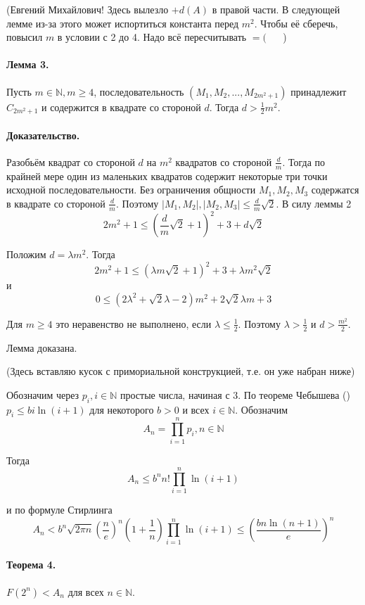 \documentclass[a4paper,14pt]{article} %
\begin{document}
(Евгений Михайлович! Здесь вылезло $+d(A)$ в правой части.
В следующей лемме из-за этого может испортиться константа перед $m^2$.
Чтобы её сберечь, повысил $m$ в условии с 2 до 4.
Надо всё пересчитывать $=($ ~~ )

\paragraph{Лемма 3.}
Пусть $m\in\mathbb{N}, m\geq 4$, последовательность $(M_1,M_2,...,M_{2m^2+1})$ принадлежит $C_{2m^2+1}$ и содержится в квадрате со стороной $d$.
Тогда $d>\frac{1}{2}m^2$.

\paragraph{Доказательство.} Разобьём квадрат со стороной $d$ на $m^2$ квадратов со стороной $\frac{d}{m}$.
Тогда по крайней мере один из маленьких квадратов содержит некоторые три точки исходной последовательности.
Без ограничения общности $M_1,M_2,M_3$ содержатся в квадрате со стороной $\frac{d}{m}$.
Поэтому $|M_1,M_2|,|M_2,M_3| \leq \frac{d}{m}\sqrt{2}$.
В силу леммы 2
$$
2m^2+1 \leq\left(\frac{d}{m}\sqrt{2}+1\right)^2+3+d\sqrt{2}
$$

Положим $d=\lambda m^2$.
Тогда
$$
2m^2+1 \leq \left(\lambda m \sqrt2 + 1 \right)^2 + 3 + \lambda m^2 \sqrt2
$$
и
$$
0\leq \left( 2\lambda^2 + \sqrt2 \lambda - 2 \right)m^2 + 2\sqrt2 \lambda m + 3
$$

Для $m\geq 4$ это неравенство не выполнено, если $\lambda \leq \frac{1}{2}$.
Поэтому $\lambda > \frac{1}{2}$ и $d>\frac{m^2}{2}$.

Лемма доказана.

(Здесь вставляю кусок с примориальной конструкцией, т.е. он уже набран ниже)


Обозначим через $p_i, i\in\mathbb{N}$ простые числа, начиная с 3.
По теореме Чебышева (\cite{Buhshtab}) $p_i \leq bi\ln(i+1)$ для некоторого $b>0$ и всех $i\in\mathbb{N}$.
Обозначим
$$
A_n=\prod_{i=1}^{n} p_i, n\in\mathbb{N}
$$

Тогда
$$
A_n\leq b^n n! \prod_{i=1}^{n} \ln(i+1)
$$

и по формуле Стирлинга
\begin{equation*}\label{ocenka_Stirling}
A_n <
b^n \sqrt{2\pi n} \left(\frac{n}{e}\right)^n \left(1+\frac{1}{n}\right) \prod_{i=1}^{n} \ln(i+1)
\leq \left(\frac{bn\ln (n+1)}{e}\right)^n
\end{equation*}


\paragraph{Теорема 4.}
$F(2^n)<A_n$ для всех $n\in\mathbb{N}$.
\end{document}

